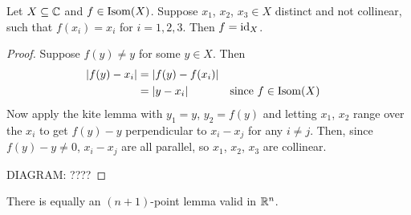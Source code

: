 \documentclass{../template/note}
\begin{document}
    \begin{lemma}
        Let \(X \subseteq \mathbb C\) and \(f \in \operatorname{Isom}(X)\). Suppose \(x_1\), \(x_2\), \(x_3 \in X\) distinct and not collinear, such that \(f(x_i) = x_i\) for \(i=1,2,3\). Then \(f = \operatorname{id}_X\).
    \end{lemma}
    
    \begin{proof}
        Suppose \(f(y) \neq y\) for some \(y \in X\). Then
        \begin{align*}
            |f(y) - x_i| &= |f(y) - f(x_i)| \\
            &= |y - x_i| && \text{since } f \in \operatorname{Isom}(X)
        \end{align*}
        Now apply the kite lemma with \(y_1 = y\), \(y_2 = f(y)\) and letting \(x_1\), \(x_2\) range over the \(x_i\) to get \(f(y) - y\) perpendicular to \(x_i - x_j\) for any \(i \neq j\). Then, since \(f(y)-y \neq 0\),  \(x_i - x_j\) are all parallel, so \(x_1\), \(x_2\), \(x_3\) are collinear.

        DIAGRAM: ????
        
    \end{proof}
    
    \begin{remark*}
        There is equally an \((n+1)\)-point lemma valid in \(\mathbb R^n\).
    \end{remark*}
    
\end{document}
